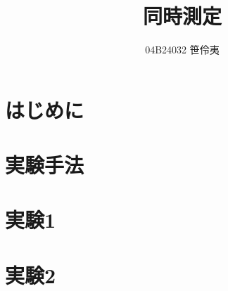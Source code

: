 \documentclass[11pt,titlepage]{ltjsbook}
\title{同時測定}
\author{04B24032 笹伶夷}
\date{}
\begin{document}
\maketitle
\tableofcontents
\clearpage

\chapter{はじめに}
\chapter{実験手法}
\chapter{実験1}
\chapter{実験2}
\end{document}
